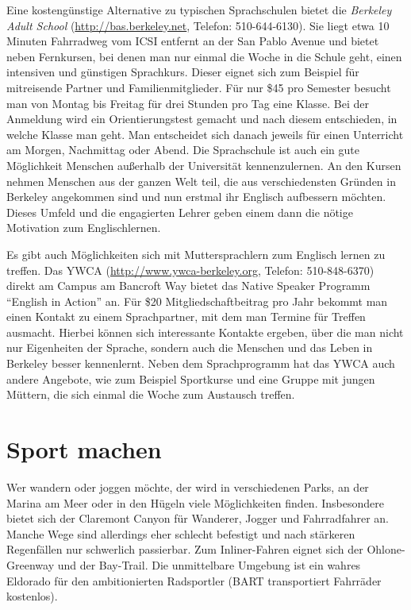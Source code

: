 \documentclass[a4paper]{scrreprt}
\begin{document}
Eine kostengünstige Alternative zu typischen Sprachschulen bietet die
\emph{Berkeley Adult School} (\url{http://bas.berkeley.net}, Telefon:
510-644-6130). Sie liegt etwa 10 Minuten Fahrradweg vom ICSI entfernt
an der San Pablo Avenue und bietet neben Fernkursen, bei denen man nur
einmal die Woche in die Schule geht, einen intensiven und günstigen
Sprachkurs. Dieser eignet sich zum Beispiel für mitreisende Partner
und Familienmitglieder. Für nur \$45 pro Semester besucht man von
Montag bis Freitag für drei Stunden pro Tag eine Klasse. Bei der
Anmeldung wird ein Orientierungstest gemacht und nach diesem
entschieden, in welche Klasse man geht. Man entscheidet sich danach
jeweils für einen Unterricht am Morgen, Nachmittag oder Abend. Die
Sprachschule ist auch ein gute Möglichkeit Menschen außerhalb der
Universität kennenzulernen. An den Kursen nehmen Menschen aus der
ganzen Welt teil, die aus verschiedensten Gründen in Berkeley
angekommen sind und nun erstmal ihr Englisch aufbessern
möchten. Dieses Umfeld und die engagierten Lehrer geben einem dann die
nötige Motivation zum Englischlernen. 

Es gibt auch Möglichkeiten sich mit Muttersprachlern zum Englisch
lernen zu treffen. Das YWCA (\url{http://www.ywca-berkeley.org}, Telefon:
510-848-6370) direkt am Campus am Bancroft Way bietet das Native
Speaker Programm ``English in Action'' an. Für \$20
Mitgliedschaftbeitrag pro Jahr bekommt man einen Kontakt zu einem
Sprachpartner, mit dem man Termine für Treffen ausmacht. Hierbei können
sich interessante Kontakte ergeben, über die man nicht nur Eigenheiten
der Sprache, sondern auch die Menschen und das Leben in Berkeley
besser kennenlernt. Neben dem Sprachprogramm hat das YWCA auch
andere Angebote, wie zum Beispiel Sportkurse und eine Gruppe mit
jungen Müttern, die sich einmal die Woche zum Austausch treffen. 

\section{Sport machen}

Wer wandern oder joggen möchte, der wird in verschiedenen Parks, an
der Marina am Meer oder in den Hügeln viele Möglichkeiten
finden. Insbesondere bietet sich der Claremont Canyon für Wanderer,
Jogger und Fahrradfahrer an. Manche Wege sind allerdings eher schlecht
befestigt und nach stärkeren Regenfällen nur schwerlich
passierbar. Zum Inliner-Fahren eignet sich der Ohlone-Greenway und der
Bay-Trail. Die unmittelbare Umgebung ist ein wahres Eldorado für den
ambitionierten Radsportler (BART transportiert Fahrräder kostenlos).
\end{document}
